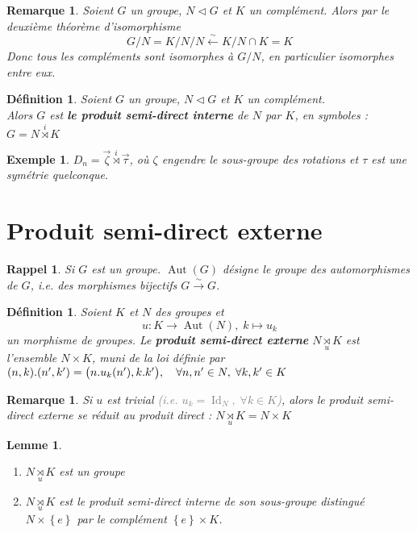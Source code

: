 \documentclass[a4paper, oneside]{report}
\theoremstyle{break}
\newtheorem{lemme}[thm]{Lemme}
\newtheorem{definition}[thm]{Définition}
\newtheorem*{rappel}{Rappel}
\newtheorem{exemple}[thm]{Exemple}
\newtheorem{remarque}[thm]{Remarque}
\newcommand{\gray}[1]{\textcolor{gray}{#1}}
\DeclarePairedDelimiter\ens{\left\{ }{\right\} }%
\DeclarePairedDelimiter\pa{\big(}{\big)}%
\DeclareMathOperator{\Aut}{Aut}
\DeclareMathOperator{\Id}{Id}
\renewcommand{\ens}[1]{\left\{ #1 \right\} }%
\newcommand{\slign}{\textbf}
\newcommand{\us}{\underset}
\newcommand{\os}{\overset}
\begin{document}
\begin{remarque}
Soient $G$ un groupe, $N \triangleleft G$ et $K$ un complément. Alors par le deuxième théorème d'isomorphisme
\[
G / N = K / N \big/ N \os{\sim}{\leftarrow} K \big/ N \cap K = K
\]
Donc tous les compléments sont isomorphes à $G / N$, en particulier isomorphes entre eux.
\end{remarque}

\begin{definition}
Soient $G$ un groupe, $N \triangleleft G$ et $K$ un complément.\\
Alors $G$ est \slign{le produit semi-direct interne} de $N$ par $K$, en symboles : $G = N \os{i}{\rtimes} K$
\end{definition}

\begin{exemple}
$D_n = \vec{\zeta} \os{i}{\rtimes} \vec{\tau}$, où $\zeta$ engendre le sous-groupe des rotations et $\tau$ est une symétrie quelconque.
\end{exemple}

\section{Produit semi-direct externe}

\begin{rappel}
Si $G$ est un groupe. $\Aut(G)$ désigne le groupe des automorphismes de $G$, i.e. des morphismes bijectifs $G \os{\sim}{\rightarrow} G$.
\end{rappel}



\begin{definition}
Soient $K$ et $N$ des groupes et 
\[
u : K \rightarrow \Aut(N), \; k \mapsto u_k
\]
un morphisme de groupes. Le \slign{produit semi-direct externe} $N \us{u}{\rtimes} K$ est l'ensemble $N \times K$, muni de la loi définie par $(n, k) . (n', k') = \pa{n . u_k(n'), k.k'},	\quad	\forall n, n' \in N, \; \forall k, k' \in K$
\end{definition}

\begin{remarque}
Si $u$ est trivial \gray{(i.e. $u_k = \Id_N, \; \forall k \in K$)}, alors le produit semi-direct externe se réduit au produit direct : $N \us{u}{\rtimes} K = N \times K$
\end{remarque}

\begin{lemme}
\begin{enumerate}
\item  $N \us{u}{\rtimes} K$ est un groupe

\medbreak

\item  $N \us{u}{\rtimes} K$ est le produit semi-direct interne de son sous-groupe distingué $N \times \ens{e}$ par le complément $\ens{e} \times K$.

\end{enumerate}
\end{lemme}
\end{document}
